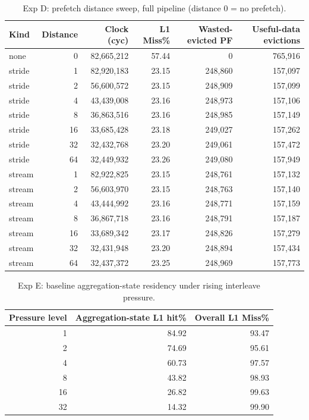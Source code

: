 \begin{table}[H]\centering\small
\begin{tabular}{lrrrrr}\toprule
Kind & Distance & Clock (cyc) & L1 Miss\% & Wasted-evicted PF & Useful-data evictions \\ \midrule
none & 0 & 82,665,212 & 57.44 & 0 & 765,916 \\
stride & 1 & 82,920,183 & 23.15 & 248,860 & 157,097 \\
stride & 2 & 56,600,572 & 23.15 & 248,909 & 157,099 \\
stride & 4 & 43,439,008 & 23.16 & 248,973 & 157,106 \\
stride & 8 & 36,863,516 & 23.16 & 248,985 & 157,149 \\
stride & 16 & 33,685,428 & 23.18 & 249,027 & 157,262 \\
stride & 32 & 32,432,768 & 23.20 & 249,061 & 157,472 \\
stride & 64 & 32,449,932 & 23.26 & 249,080 & 157,949 \\
stream & 1 & 82,922,825 & 23.15 & 248,761 & 157,132 \\
stream & 2 & 56,603,970 & 23.15 & 248,763 & 157,140 \\
stream & 4 & 43,444,992 & 23.16 & 248,771 & 157,159 \\
stream & 8 & 36,867,718 & 23.16 & 248,791 & 157,187 \\
stream & 16 & 33,689,342 & 23.17 & 248,826 & 157,279 \\
stream & 32 & 32,431,948 & 23.20 & 248,894 & 157,434 \\
stream & 64 & 32,437,372 & 23.25 & 248,969 & 157,773 \\
\bottomrule\end{tabular}
\caption{Exp D: prefetch distance sweep, full pipeline (distance 0 = no prefetch).}
\label{tab:expD}\end{table}

\begin{table}[H]\centering\small
\begin{tabular}{rrr}\toprule
Pressure level & Aggregation-state L1 hit\% & Overall L1 Miss\% \\ \midrule
1 & 84.92 & 93.47 \\
2 & 74.69 & 95.61 \\
4 & 60.73 & 97.57 \\
8 & 43.82 & 98.93 \\
16 & 26.82 & 99.63 \\
32 & 14.32 & 99.90 \\
\bottomrule\end{tabular}
\caption{Exp E: baseline aggregation-state residency under rising interleave pressure.}
\label{tab:expE-baseline}\end{table}

